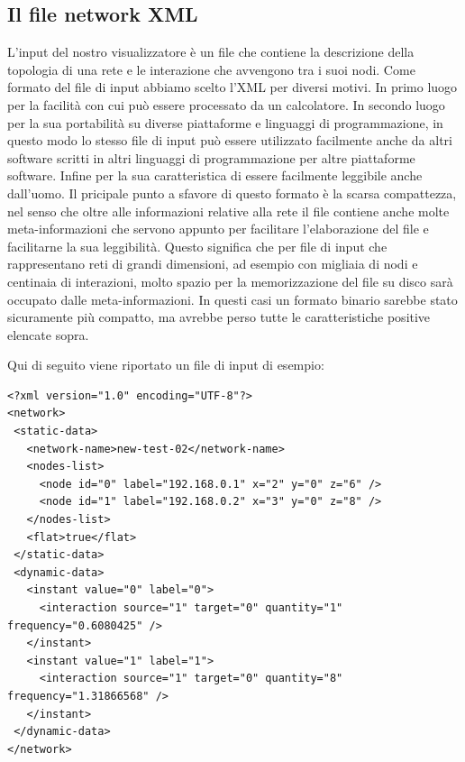\documentclass[a4paper,12pt]{article}
\begin{document}
\subsection{Il file network XML}
 
L'input del nostro visualizzatore \`e un file che contiene la descrizione della topologia di una rete e le interazione che avvengono tra i suoi nodi. Come formato del file di input abbiamo scelto l'XML per diversi motivi. In primo luogo per la facilità con cui pu\`o essere processato da un calcolatore. In secondo luogo per la sua portabilità su diverse piattaforme e linguaggi di programmazione, in questo modo lo stesso file di input pu\`o essere utilizzato facilmente anche da altri software scritti in altri linguaggi di programmazione per altre piattaforme software. Infine per la sua caratteristica di essere facilmente leggibile anche dall'uomo.
Il pricipale punto a sfavore di questo formato \`e la scarsa compattezza, nel senso che oltre alle informazioni relative alla rete il file contiene anche molte meta-informazioni che servono appunto per facilitare l'elaborazione del file e facilitarne la sua leggibilità. Questo significa che per file di input che rappresentano reti di grandi dimensioni, ad esempio con migliaia di nodi e centinaia di interazioni, molto spazio per la memorizzazione del file su disco sarà occupato dalle meta-informazioni. In questi casi un formato binario sarebbe stato sicuramente più compatto, ma avrebbe perso tutte le caratteristiche positive elencate sopra.
 
Qui di seguito viene riportato un file di input di esempio:
\begin{verbatim}
<?xml version="1.0" encoding="UTF-8"?>
<network>
 <static-data>
   <network-name>new-test-02</network-name>
   <nodes-list>
     <node id="0" label="192.168.0.1" x="2" y="0" z="6" />
     <node id="1" label="192.168.0.2" x="3" y="0" z="8" />
   </nodes-list>
   <flat>true</flat>
 </static-data>
 <dynamic-data>
   <instant value="0" label="0">
     <interaction source="1" target="0" quantity="1" frequency="0.6080425" />
   </instant>
   <instant value="1" label="1">
     <interaction source="1" target="0" quantity="8" frequency="1.31866568" />
   </instant>
 </dynamic-data>
</network>
\end{verbatim}
\end{document}
